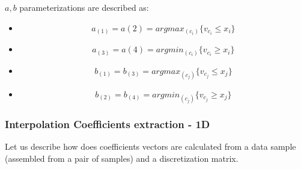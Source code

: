 	$a,b$ parameterizations are described as:
	
	\begin{itemize} \label{hypercubes}
		\item	\begin{equation} a_{(1)}=a{(2)} =argmax_{(c_i)} \{ v_{c_i} \leq x_i \} \end{equation}
		\item 	\begin{equation} a_{(3)}=a{(4)} =argmin_{(c_i)} \{ v_{c_i} \geq x_i \}  \end{equation} 
		\item 	\begin{equation} b_{(1)}= b_{(3)} =argmax_{(c_j)} \{ v_{c_j} \leq x_j \}  \end{equation}
		\item 	\begin{equation} b_{(2)}=b_{(4)} =argmin_{(c_j)} \{ v_{c_j} \geq x_j \} \end{equation} 
	\end{itemize}		
	
	\subsubsection{Interpolation Coefficients extraction - 1D}
	
	Let us describe how does coefficients vectors are calculated from a data sample (assembled from a pair of samples) and a discretization matrix.
		
		
	\newcommand{\MyNewVariable}{(0.3 , 0.8)}
				

